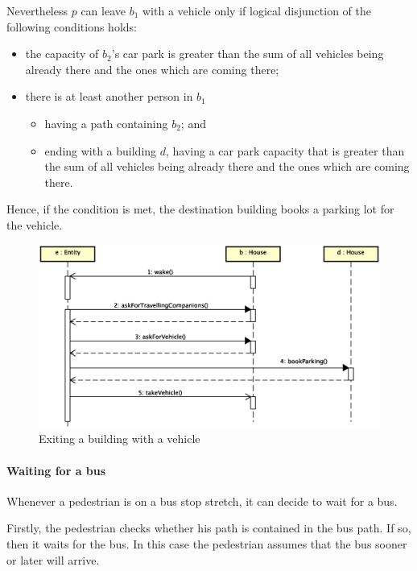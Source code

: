 Nevertheless $p$ can leave $b_1$ with a vehicle only if logical disjunction
of the following conditions holds:
\begin{itemize}
\item the capacity of $b_2$'s car park is greater than the sum of all
vehicles being already there and the ones which are coming there;
\item there is at least another person in $b_1$
  \begin{itemize}
  \item having a path containing $b_2$; and
  \item ending with a building $d$, having a car park capacity that is
    greater than the sum of all vehicles being already there and the ones
    which are coming there.
  \end{itemize}
\end{itemize}
Hence, if the condition is met, the destination building books
a parking lot for the vehicle.

\begin{figure}[H]
\centering
\includegraphics[width=\columnwidth,trim=1 0 0 0,clip]
  {images/solution/going_out_with_vehicle.eps}
\caption{Exiting a building with a vehicle}
\label{fig:app-inter-vehicle}
\end{figure}

\paragraph{Waiting for a bus}
Whenever a pedestrian is on a bus stop stretch, it can decide to wait for a
bus.

Firstly, the pedestrian checks whether his path is contained in the bus path.
If so, then it waits for the bus. In this case the pedestrian assumes that
the bus sooner or later will arrive.

